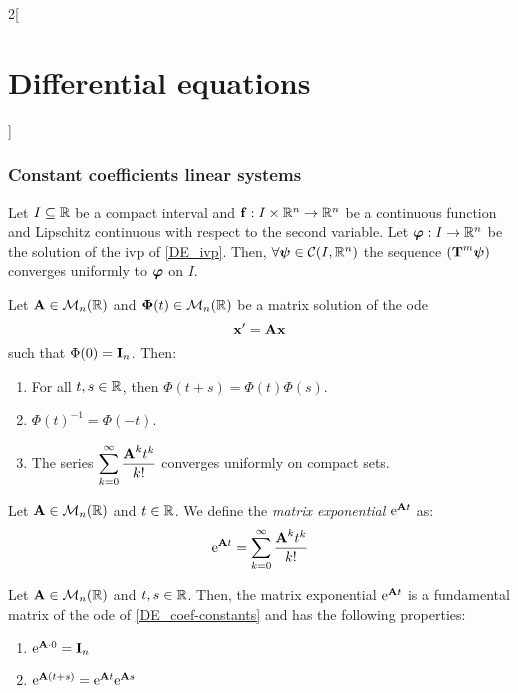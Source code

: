 \documentclass[../../../main.tex]{subfiles}
\begin{document}
\begin{multicols}{2}[\section{Differential equations}]
  \subsubsection{Constant coefficients linear systems}
  \begin{lemma}
    Let $I\subseteq\mathbb{R}$ be a compact interval and $\boldsymbol{\mathrm{f}}:I\times\mathbb{R}^n\rightarrow\mathbb{R}^n$ be a continuous function and Lipschitz continuous with respect to the second variable. Let $\boldsymbol{\mathrm{\varphi}}:I\rightarrow\mathbb{R}^n$ be the solution of the ivp of \cref{DE_ivp}. Then, $\forall\boldsymbol{\mathrm{\psi}}\in\mathcal{C}(I,\mathbb{R}^n)$ the sequence $(\boldsymbol{\mathrm{T}}^m\boldsymbol{\mathrm{\psi}})$ converges uniformly to $\boldsymbol{\mathrm{\varphi}}$ on $I$.
  \end{lemma}
  \begin{theorem}
    Let $\boldsymbol{\mathrm{A}}\in\mathcal{M}_n(\mathbb{R})$ and $\boldsymbol{\mathrm{\Phi}}(t)\in\mathcal{M}_n(\mathbb{R})$ be a matrix solution of the ode
    \begin{equation}\label{DE_coef-constants}
      \boldsymbol{\mathrm{x}}'=\boldsymbol{\mathrm{A}}\boldsymbol{\mathrm{x}}
    \end{equation}
    such that $\Phi(0)=\boldsymbol{\mathrm{I}}_n$. Then:
    \begin{enumerate}
      \item For all $t,s\in\mathbb{R}$, then $\Phi(t+s)=\Phi(t)\Phi(s)$.
      \item ${\Phi(t)}^{-1}=\Phi(-t)$.
      \item The series $\displaystyle\sum_{k=0}^\infty \frac{\boldsymbol{\mathrm{A}}^kt^k}{k!}$ converges uniformly on compact sets.
    \end{enumerate}
  \end{theorem}
  \begin{definition}
    Let $\boldsymbol{\mathrm{A}}\in\mathcal{M}_n(\mathbb{R})$ and $t\in\mathbb{R}$. We define the \textit{matrix exponential} $\mathrm{e}^{\boldsymbol{\mathrm{A}}t}$ as: $$\mathrm{e}^{\boldsymbol{\mathrm{A}}t}=\sum_{k=0}^\infty\frac{\boldsymbol{\mathrm{A}}^kt^k}{k!}$$
  \end{definition}
  \begin{prop}
    Let $\boldsymbol{\mathrm{A}}\in\mathcal{M}_n(\mathbb{R})$ and $t,s\in \mathbb{R}$. Then, the matrix exponential $\mathrm{e}^{\boldsymbol{\mathrm{A}}t}$ is a fundamental matrix of the ode of \cref{DE_coef-constants} and has the following properties:
    \begin{enumerate}
      \item $\mathrm{e}^{\boldsymbol{\mathrm{A}}\cdot 0}=\boldsymbol{\mathrm{I}}_n$
      \item $\mathrm{e}^{\boldsymbol{\mathrm{A}}(t+s)}=\mathrm{e}^{\boldsymbol{\mathrm{A}}t}\mathrm{e}^{\boldsymbol{\mathrm{A}}s}$

\end{enumerate}
\end{prop}
\end{multicols}
\end{document}
